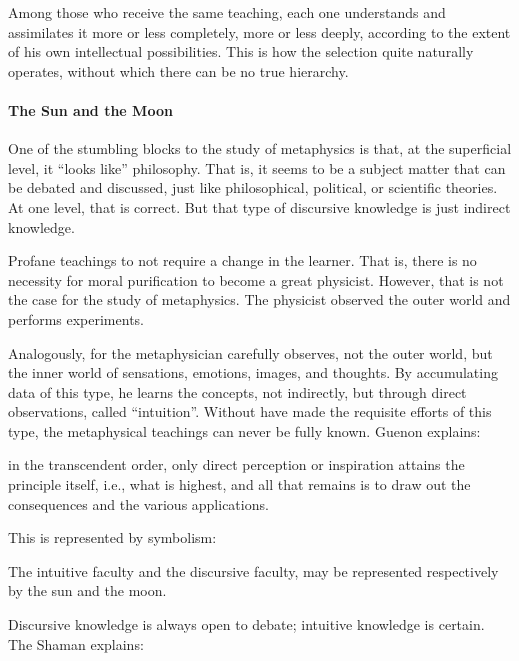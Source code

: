 \begin{quotex}
Among those who receive the same teaching, each one understands and assimilates it more or less completely, more or less deeply, according to the extent of his own intellectual possibilities. This is how the selection quite naturally operates, without which there can be no true hierarchy.
\end{quotex}


\paragraph{The Sun and the Moon}

One of the stumbling blocks to the study of metaphysics is that, at the superficial level, it ``looks like'' philosophy. That is, it seems to be a subject matter that can be debated and discussed, just like philosophical, political, or scientific theories. At one level, that is correct. But that type of discursive knowledge is just indirect knowledge.

Profane teachings to not require a change in the learner. That is, there is no necessity for moral purification to become a great physicist. However, that is not the case for the study of metaphysics. The physicist observed the outer world and performs experiments.

Analogously, for the metaphysician carefully observes, not the outer world, but the inner world of sensations, emotions, images, and thoughts. By accumulating data of this type, he learns the concepts, not indirectly, but through direct observations, called ``intuition''. Without have made the requisite efforts of this type, the metaphysical teachings can never be fully known. Guenon explains:

\begin{quotex}
in the transcendent order, only direct perception or inspiration attains the principle itself, i.e., what is highest, and all that remains is to draw out the consequences and the various applications.
\end{quotex}


This is represented by symbolism:

\begin{quotex}
The intuitive faculty and the discursive faculty, may be represented respectively by the sun and the moon.
\end{quotex}


Discursive knowledge is always open to debate; intuitive knowledge is certain. The Shaman explains:

